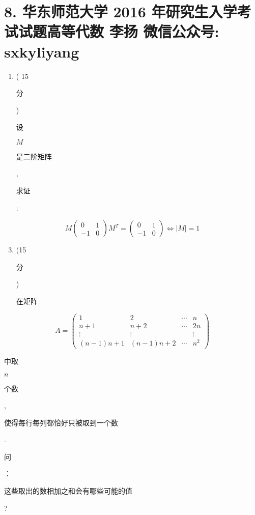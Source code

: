 \documentclass[10pt]{article}
\begin{document}
\section{8. 华东师范大学 2016 年研究生入学考试试题高等代数 
 李扬 
 微信公众号: sxkyliyang}
\begin{enumerate}
  \item ( 15 \begin{CJK}{UTF8}{mj}分\end{CJK}) \begin{CJK}{UTF8}{mj}设\end{CJK} $M$ \begin{CJK}{UTF8}{mj}是二阶矩阵\end{CJK}, \begin{CJK}{UTF8}{mj}求证\end{CJK}:
\end{enumerate}
$$
M\left(\begin{array}{cc}
0 & 1 \\
-1 & 0
\end{array}\right) M^{T}=\left(\begin{array}{cc}
0 & 1 \\
-1 & 0
\end{array}\right) \Leftrightarrow|M|=1
$$

\begin{enumerate}
  \setcounter{enumi}{2}
  \item (15 \begin{CJK}{UTF8}{mj}分\end{CJK}) \begin{CJK}{UTF8}{mj}在矩阵\end{CJK}
\end{enumerate}
$$
A=\left(\begin{array}{cccc}
1 & 2 & \cdots & n \\
n+1 & n+2 & \cdots & 2 n \\
\vdots & \vdots & & \vdots \\
(n-1) n+1 & (n-1) n+2 & \cdots & n^{2}
\end{array}\right)
$$
\begin{CJK}{UTF8}{mj}中取\end{CJK} $n$ \begin{CJK}{UTF8}{mj}个数\end{CJK}, \begin{CJK}{UTF8}{mj}使得每行每列都恰好只被取到一个数\end{CJK}. \begin{CJK}{UTF8}{mj}问\end{CJK}：\begin{CJK}{UTF8}{mj}这些取出的数相加之和会有哪些可能的值\end{CJK}?
\end{document}
